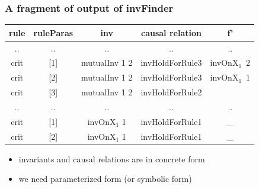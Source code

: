 \documentclass{beamer}
\begin{document}
\begin{frame}\frametitle{A fragment of output of {\sf invFinder}}
 \begin{table}[!t]
\begin{tabular}{|c|c|c|c|c|  }
\hline
  rule& ruleParas&inv&causal relation &   f'  \\
\hline
  .. & ..&.. &..&.. \\

\hline
  crit  & [1]&mutualInv 1 2& invHoldForRule3 &invOnX$_1$~2 \\
\hline
  crit &[2]& mutualInv 1 2& invHoldForRule3 &invOnX$_1$~1  \\
\hline
  crit & [3]& mutualInv 1 2 & invHoldForRule2  & \\
\hline
  .. & ..&.. &..&.. \\

\hline
  crit  & [1]&invOnX$_1$ 1 & invHoldForRule1 &\_ \\
\hline
  crit &[2]& invOnX$_1$ 1 & invHoldForRule1 &\_  \\
\hline
\end{tabular}
\end{table}
\begin{itemize}
\item invariants and causal relations are in concrete form
\item we need parameterized form (or symbolic form)
\end{itemize}
\end{frame}
\end{document}
